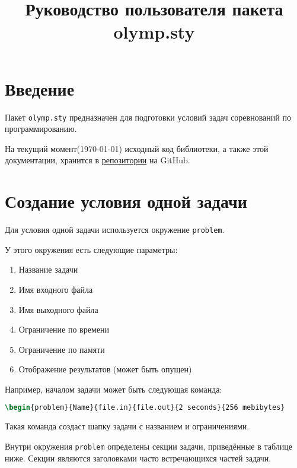 \documentclass[11pt,a4paper,oneside]{article}
\begin{document}
\renewcommand{\t}{\texttt}
\newcommand{\giturl}[1]{\href{https://github.com/GassaFM/olymp.sty}{#1}}
\newcommand{\subgiturl}[2]{\href{https://github.com/GassaFM/olymp.sty/#1}{#2}}
\newcommand{\command}[1]{\t{\textbackslash#1}}

\title{Руководство пользователя пакета olymp.sty}
\author{}
\maketitle
\newpage

\tableofcontents
\newpage

\section{Введение}

Пакет \t{olymp.sty} предназначен для подготовки условий задач
соревнований по программированию. 

На текущий момент(\today) исходный код библиотеки, а также
этой документации, хранится в \giturl{репозитории} на GitHub.

\newpage
\section{Создание условия одной задачи}

Для условия одной задачи используется окружение \t{problem}.

У этого окружения есть следующие параметры:
\begin{enumerate}
\item Название задачи
\item Имя входного файла
\item Имя выходного файла
\item Ограничение по времени
\item Ограничение по памяти
\item Отображение результатов (может быть опущен)
\end{enumerate}

Например, началом задачи может быть следующая команда:
\begin{lstlisting}[language=tex]
\begin{problem}{Name}{file.in}{file.out}{2 seconds}{256 mebibytes}
\end{lstlisting}
Такая команда создаст шапку задачи с названием и ограничениями.

Внутри окружения \t{problem} определены секции задачи, приведённые в таблице ниже.
Секции являются заголовками часто встречающихся частей задачи.
\end{document}
